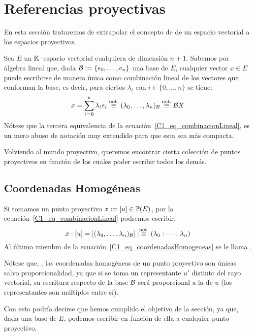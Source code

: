 \section{Referencias proyectivas}
En esta sección trataremos de extrapolar el concepto de  de un espacio vectorial a los espacios proyectivos.

Sea $E$ un $\mathbb{K}$--espacio vectorial cualquiera de dimensión $n+1$. Sabemos por álgebra lineal que, dada $\mathcal{B}:=\{e_0,\dots,e_n\}$ una base de $E$, cualquier vector $x\in E$ puede escribirse de manera única como combinación lineal de los vectores que conforman la base, es decir, para ciertos $\lambda_i$ con $i\in\{0,\dots,n\}$ se tiene:
\begin{equation}
\label{C1_eq_combinacionLineal}
x=\sum_{i=0}^{n}\lambda_ie_i\stackrel{\textrm{not.}}{\equiv}(\lambda_0,\dots,\lambda_n)_{\mathcal{B}}\stackrel{\textrm{not.}}{\equiv}\mathcal{B}X
\end{equation}
Nótese que la tercera equivalencia de la ecuación~\eqref{C1_eq_combinacionLineal}, es un mero abuso de notación muy extendido para que esta sea más compacta.

Volviendo al mundo proyectivo, queremos encontrar cierta colección de puntos proyectivos en función de los cuales poder escribir todos los demás. 
\subsection{Coordenadas Homogéneas}
\label{C1_coordenadasHomogeneas}
Si tomamos un punto proyectivo $x:=\left [ u \right ]\in\mathbb{P}(E)$, por la ecuación~\eqref{C1_eq_combinacionLineal} podremos escribir:
\begin{equation}
	\label{C1_eq_coordenadasHomogeneas}
	x:\left [ u \right ]=\left [ (\lambda_0,\dots,\lambda_n)_{\mathcal{B}} \right ]:\stackrel{\textrm{not.}}{\equiv}(\lambda_0:\dots:\lambda_n)
\end{equation}
Al último miembro de la ecuación~\eqref{C1_eq_coordenadasHomogeneas} se le llama .

Nótese que, , las coordenadas homogéneas de un punto proyectivo son únicas salvo proporcionalidad, ya que si se toma un representante $u'$ distinto del rayo vectorial, su escritura respecto de la base $\mathcal{B}$ será proporcional a la de $u$ (los representantes son múltiplos entre sí).

Con esto podría decirse que hemos cumplido el objetivo de la sección, ya que, dada una base de $E$, podemos escribir en función de ella a cualquier punto proyectivo.


